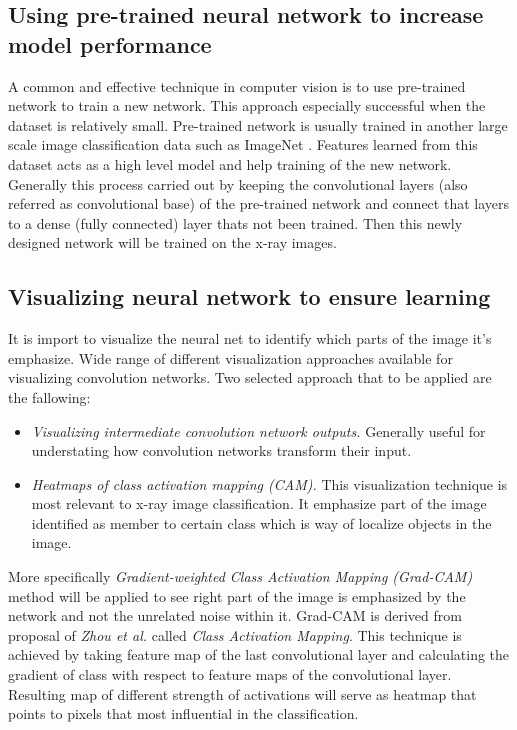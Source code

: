 \documentclass[12pt, twoside, a4paper]{article}
\begin{document}

\subsection{Using pre-trained neural network to increase model performance}
A common and effective technique in computer vision is to use pre-trained network to train a new network. This approach especially successful when the dataset is relatively small. Pre-trained network is usually trained in another large scale image classification data such as ImageNet \cite{imagenet}. Features learned from this dataset acts as a high level model and help training of the new network. Generally this process carried out by keeping the convolutional layers (also referred as convolutional base) of the pre-trained network and connect that layers to a dense (fully connected) layer thats not been trained. Then this newly designed network will be trained on the x-ray images.

\subsection{Visualizing neural network to ensure learning}
It is import to visualize the neural net to identify which parts of the image it's emphasize. Wide range of different visualization approaches available for visualizing convolution networks. Two selected approach that to be applied are the fallowing:
\begin{itemize}
    \item \textit{Visualizing intermediate convolution network outputs.} Generally useful for understating how convolution networks transform their input.
    \item \textit{Heatmaps of class activation mapping (CAM).} This visualization technique is most relevant to x-ray image classification. It emphasize part of the image identified as member to certain class which is way of localize objects in the image. 
\end{itemize}

More specifically \textit{Gradient-weighted Class Activation Mapping (Grad-CAM)} \cite{heatmap} method will be applied to see right part of the image is emphasized by the network and not the unrelated noise within it. Grad-CAM is derived from proposal of \textit{Zhou et al.} \cite{cam} called \textit{Class Activation Mapping}. This technique is achieved by taking feature map of the last convolutional layer and calculating the gradient of class with respect to feature maps of the convolutional layer. Resulting map of different strength of activations will serve as heatmap that points to pixels that most influential in the classification.
\end{document}
